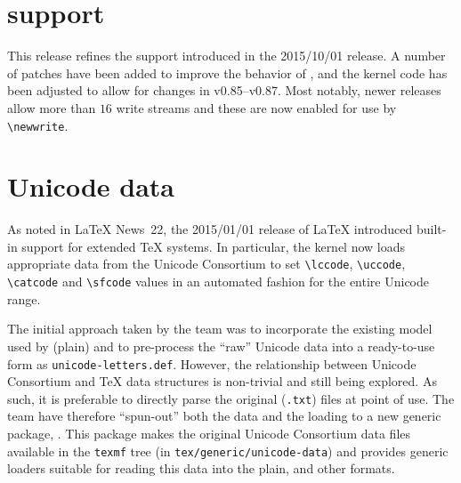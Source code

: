 \documentclass{ltnews}
\begin{document}
\maketitle

\section{ support}

This release refines the  support introduced in the
2015/10/01 release. A number of patches have been added to improve the
behavior of , and the kernel code has been adjusted to
allow for changes in  v0.85--v0.87. Most notably, newer
 releases allow more than $16$ write streams and these are now
enabled for use by \verb|\newwrite|.

\section{Unicode data}

As noted in \LaTeX{} News~22, the 2015/01/01 release of \LaTeX{} introduced
built-in support for extended \TeX{} systems. In particular, the kernel now
loads appropriate data from the Unicode Consortium to set \verb|\lccode|,
\verb|\uccode|, \verb|\catcode| and \verb|\sfcode| values in an automated
fashion for the entire Unicode range.

The initial approach taken by the team was to incorporate the existing model
used by (plain)  and to pre-process the ``raw'' Unicode data into
a ready-to-use form as \verb|unicode-letters.def|. However, the relationship
between Unicode Consortium and \TeX{} data structures is non-trivial and still
being explored. As such, it is preferable to directly parse the original
(\verb|.txt|) files at point of use. The team have therefore ``spun-out'' both
the data and the loading to a new generic package, . This
package makes the original Unicode Consortium data files available in the
\verb|texmf| tree (in \verb|tex/generic/unicode-data|) and provides generic
loaders suitable for reading this data into the plain, \LaTeXe{} and other
formats.
\end{document}
